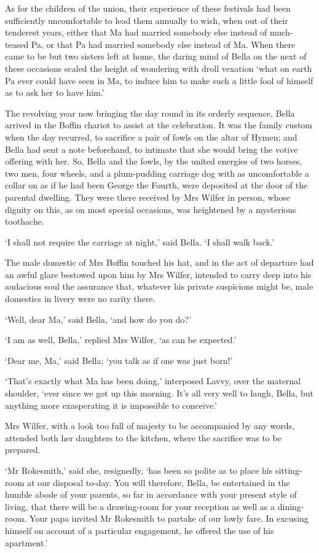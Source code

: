 As for the children of the union, their experience of these festivals
had been sufficiently uncomfortable to lead them annually to wish, when
out of their tenderest years, either that Ma had married somebody else
instead of much-teased Pa, or that Pa had married somebody else instead
of Ma. When there came to be but two sisters left at home, the daring
mind of Bella on the next of these occasions scaled the height of
wondering with droll vexation ‘what on earth Pa ever could have seen in
Ma, to induce him to make such a little fool of himself as to ask her to
have him.’

The revolving year now bringing the day round in its orderly sequence,
Bella arrived in the Boffin chariot to assist at the celebration. It was
the family custom when the day recurred, to sacrifice a pair of fowls
on the altar of Hymen; and Bella had sent a note beforehand, to intimate
that she would bring the votive offering with her. So, Bella and the
fowls, by the united energies of two horses, two men, four wheels, and a
plum-pudding carriage dog with as uncomfortable a collar on as if he
had been George the Fourth, were deposited at the door of the parental
dwelling. They were there received by Mrs Wilfer in person, whose
dignity on this, as on most special occasions, was heightened by a
mysterious toothache.

‘I shall not require the carriage at night,’ said Bella. ‘I shall walk
back.’

The male domestic of Mrs Boffin touched his hat, and in the act of
departure had an awful glare bestowed upon him by Mrs Wilfer, intended
to carry deep into his audacious soul the assurance that, whatever his
private suspicions might be, male domestics in livery were no rarity
there.

‘Well, dear Ma,’ said Bella, ‘and how do you do?’

‘I am as well, Bella,’ replied Mrs Wilfer, ‘as can be expected.’

‘Dear me, Ma,’ said Bella; ‘you talk as if one was just born!’

‘That’s exactly what Ma has been doing,’ interposed Lavvy, over the
maternal shoulder, ‘ever since we got up this morning. It’s all very
well to laugh, Bella, but anything more exasperating it is impossible to
conceive.’

Mrs Wilfer, with a look too full of majesty to be accompanied by any
words, attended both her daughters to the kitchen, where the sacrifice
was to be prepared.

‘Mr Rokesmith,’ said she, resignedly, ‘has been so polite as to place
his sitting-room at our disposal to-day. You will therefore, Bella, be
entertained in the humble abode of your parents, so far in accordance
with your present style of living, that there will be a drawing-room for
your reception as well as a dining-room. Your papa invited Mr Rokesmith
to partake of our lowly fare. In excusing himself on account of a
particular engagement, he offered the use of his apartment.’

